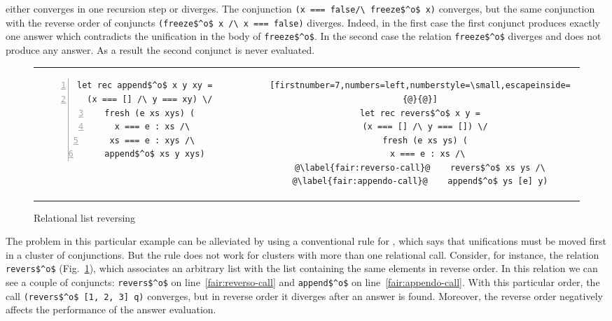 either converges in one recursion step or diverges. The conjunction \lstinline{(x === false/\ freeze$^o$ x)} converges, but the same conjunction with the reverse order of conjuncts
\lstinline{(freeze$^o$ x /\ x === false)} diverges. Indeed, in the first case the first conjunct produces exactly one answer which contradicts the unification in the body
of \lstinline{freeze$^o$}. In the second case the relation \lstinline{freeze$^o$} diverges and does not produce any answer. As a result the second conjunct
is never evaluated.

\begin{figure}[h!]
\centering
\begin{tabular}{cp{3cm}c}
\begin{lstlisting}[numbers=left,numberstyle=\small]
let rec append$^o$ x y xy =
  (x === [] /\ y === xy) \/
  fresh (e xs xys) (
    x === e : xs /\ 
    xs === e : xys /\ 
    append$^o$ xs y xys)
\end{lstlisting}
& &
\begin{lstlisting}[firstnumber=7,numbers=left,numberstyle=\small,escapeinside={@}{@}]
let rec revers$^o$ x y =
  (x === [] /\ y === []) \/
  fresh (e xs ys) (
    x === e : xs /\ 
@\label{fair:reverso-call}@    revers$^o$ xs ys /\
@\label{fair:appendo-call}@    append$^o$ ys [e] y)
\end{lstlisting}
\end{tabular}

\caption{Relational list reversing}
\label{fair:lst-reverso}
\end{figure}

The problem in this particular example can be alleviated by using a conventional rule for \mk, which says that unifications must be moved first in a cluster of conjunctions.
But the rule does not work for clusters with more than one relational call. Consider, for instance, the relation \lstinline{revers$^o$} (Fig.~\ref{fair:lst-reverso}), which associates
an arbitrary list with the list containing the same elements in reverse order. In this relation we can see a couple of conjuncts: \lstinline{revers$^o$} on line~\ref{fair:reverso-call} and
\lstinline{append$^o$} on line~\ref{fair:appendo-call}. With this particular order, the call \lstinline{(revers$^o$ [1, 2, 3] q)} converges, but in reverse order it diverges after an answer
is found. Moreover, the reverse order negatively affects the performance of the answer evaluation.

